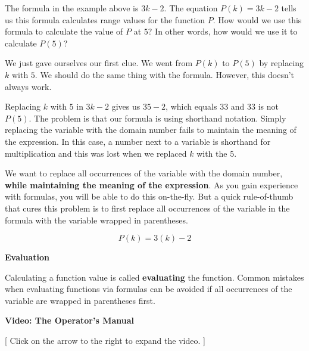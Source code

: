 \documentclass{ximera}
\begin{document}
The formula in the example above is $3k - 2$.  The equation $P(k) = 3k - 2$ tells us this formula calculates range values for the function $P$.  How would we use this formula to calculate the value of $P$ at $5$?   In other words, how would we use it to calculate $P(5)$?

We just gave ourselves our first clue. We went from $P(k)$ to $P(5)$ by replacing $k$ with $5$.  We should do the same thing with the formula. However, this doesn't always work.






Replacing $k$ with $5$ in $3k - 2$ gives us $35-2$, which equals $33$ and $33$ is not $P(5)$. The problem is that our formula is using shorthand notation. Simply replacing the variable with the domain number fails to maintain the meaning of the expression.  In this case, a number next to a variable is shorthand for multiplication and this was lost when we replaced $k$ with the $5$.

We want to replace all occurrences of the variable with the domain number, \textbf{\textcolor{purple!85!blue}{while maintaining the meaning of the expression}}.  As you gain experience with formulas, you will be able to do this on-the-fly.  But a quick rule-of-thumb that cures this problem is to first replace all occurrences of the variable in the formula with the variable wrapped in parentheses.



\[  P(k) = 3(k) - 2  \]


\begin{procedure} \textbf{\textcolor{purple!30!blue}{Evaluation}}   

Calculating a function value is called \textbf{evaluating} the function.  Common mistakes when evaluating functions via formulas can be avoided if all occurrences of the variable are wrapped in parentheses first.
\end{procedure}








\begin{explanation} \textbf{\textcolor{red!75!green}{Video: The Operator's Manual}}

[ Click on the arrow to the right to expand the video. ]
\begin{expandable} 

\begin{center}
\end{center}

\end{expandable}
\end{explanation}
\end{document}
